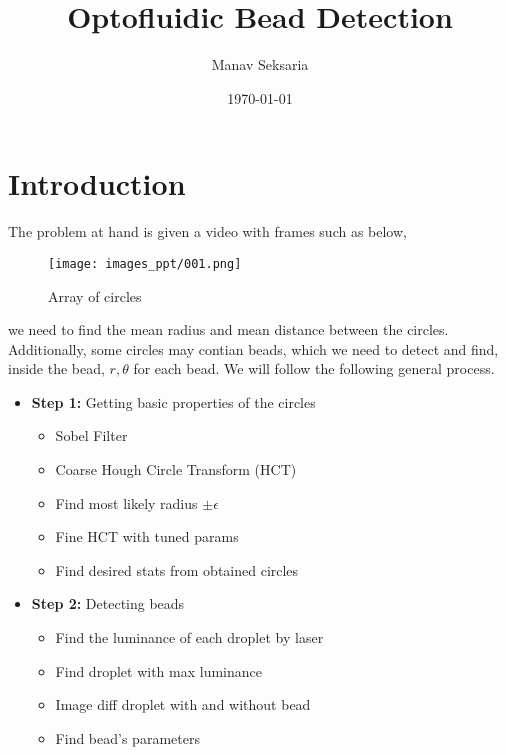 \documentclass[hidelinks]{book}
\title{Optofluidic Bead Detection}
\author{Manav Seksaria}
\date{\today}
\numberwithin{equation}{section}
\begin{document}
\maketitle

\pagestyle{fancy}
\fancyhead{}
\fancyfoot{}

\section{Introduction}\label{sec:intro}
The problem at hand is given a video with frames such as below,

\begin{figure}[H]\label{fig:intro_beads}
  \centering
  \texttt{[image: images\_ppt/001.png]}
  \caption{Array of circles}
\end{figure}

\noindent we need to find the mean radius and mean distance between the circles. Additionally, some circles may contian beads, which we need to detect and find, inside the bead, $r, \theta$ for each bead. We will follow the following general process.

\begin{itemize}
  \item \textbf{Step 1:} Getting basic properties of the circles
  \begin{itemize}
    \item Sobel Filter
    \item Coarse Hough Circle Transform (HCT)
    \item Find most likely radius $\pm \epsilon$
    \item Fine HCT with tuned params
    \item Find desired stats from obtained circles
  \end{itemize}
  \item \textbf{Step 2:} Detecting beads
  \begin{itemize}
    \item Find the luminance of each droplet by laser
    \item Find droplet with max luminance
    \item Image diff droplet with and without bead
    \item Find bead's parameters
  \end{itemize}
\end{itemize}
\end{document}
